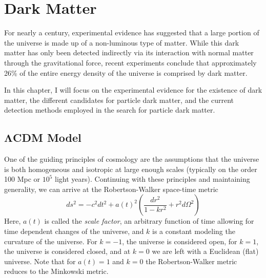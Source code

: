 

\pagestyle{cu}
\graphicspath{{./Chapter1/images/}}

\chapter[Dark Matter][Dark Matter]{Dark Matter}

For nearly a century, experimental evidence has suggested that a large portion of the universe is made up of a non-luminous type of matter.  While this dark matter has only been detected indirectly via its interaction with normal matter through the gravitational force, recent experiments conclude that approximately 26\% of the entire energy density of the universe is comprised by dark matter.

	In this chapter, I will focus on the experimental evidence for the existence of dark matter, the different candidates for particle dark matter, and the current detection methods employed in the search for particle dark matter.
	
	
\section[$\Lambda$CDM Model][$\Lambda$CDM Model]{$\boldsymbol{\Lambda}$CDM Model}
\label{sec:cdm}

	One of the guiding principles of cosmology are the assumptions that the universe is both homogeneous and isotropic at large enough scales (typically on the order 100 Mpc or $10^{5}$ light years).  Continuing with these principles and maintaining generality, we can arrive at the Robertson-Walker space-time metric
	\begin{equation}
		ds^2 = -c^{2}dt^{2} + a(t)^{2}\left( \dfrac{dr^{2}}{1 - kr^{2}} + r^{2}d\Omega^{2}\right)
	\end{equation}
Here, $a(t)$ is called the \emph{scale factor}, an arbitrary function of time allowing for time dependent changes of the universe, and $k$ is a constant modeling the curvature of the universe.  For $k=-1$, the universe is considered open, for $k=1$, the universe is considered closed, and at $k=0$ we are left with a Euclidean (flat) universe.  Note that for $a(t) = 1$ and $k = 0$ the Robertson-Walker metric reduces to the Minkowski metric.

